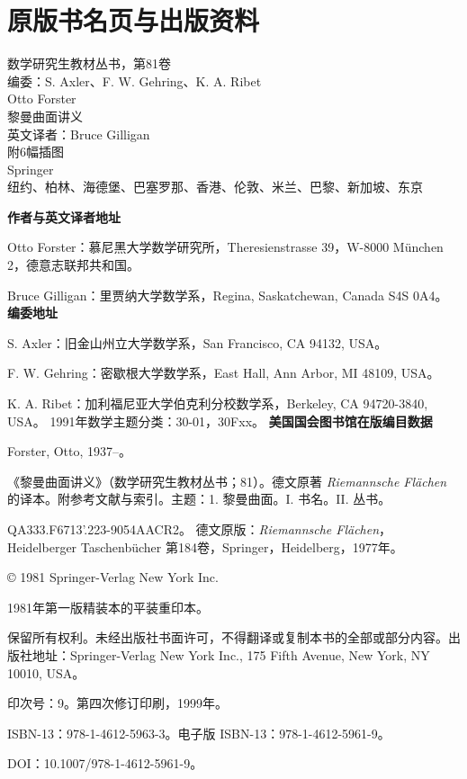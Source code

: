\chapter*{原版书名页与出版资料}
\begin{center}
数学研究生教材丛书，第81卷\\[1em]
编委：S. Axler、F. W. Gehring、K. A. Ribet\\[2em]
{\Large Otto Forster}\\[1em]
{\LARGE 黎曼曲面讲义}\\[1em]
英文译者：Bruce Gilligan\\附6幅插图\\[2em]
Springer\\纽约、柏林、海德堡、巴塞罗那、香港、伦敦、米兰、巴黎、新加坡、东京
\end{center}
\bigskip
\noindent\textbf{作者与英文译者地址}\par
Otto Forster：慕尼黑大学数学研究所，Theresienstrasse 39，W-8000 München 2，德意志联邦共和国。\par
Bruce Gilligan：里贾纳大学数学系，Regina, Saskatchewan, Canada S4S 0A4。
\medskip
\noindent\textbf{编委地址}\par
S. Axler：旧金山州立大学数学系，San Francisco, CA 94132, USA。\par
F. W. Gehring：密歇根大学数学系，East Hall, Ann Arbor, MI 48109, USA。\par
K. A. Ribet：加利福尼亚大学伯克利分校数学系，Berkeley, CA 94720-3840, USA。
\medskip
\noindent 1991年数学主题分类：30-01，30Fxx。
\medskip
\noindent\textbf{美国国会图书馆在版编目数据}\par
Forster, Otto, 1937--。\par
《黎曼曲面讲义》（数学研究生教材丛书；81）。德文原著 \textit{Riemannsche Flächen} 的译本。附参考文献与索引。主题：1. 黎曼曲面。I. 书名。II. 丛书。\par
QA333.F6713'.223-9054\quad AACR2。
\medskip
德文原版：\textit{Riemannsche Flächen}，Heidelberger Taschenbücher 第184卷，Springer，Heidelberg，1977年。\par
© 1981 Springer-Verlag New York Inc.\par
1981年第一版精装本的平装重印本。\par
保留所有权利。未经出版社书面许可，不得翻译或复制本书的全部或部分内容。出版社地址：Springer-Verlag New York Inc., 175 Fifth Avenue, New York, NY 10010, USA。\par
印次号：9。第四次修订印刷，1999年。\par
ISBN-13：978-1-4612-5963-3。电子版 ISBN-13：978-1-4612-5961-9。\par
DOI：10.1007/978-1-4612-5961-9。
